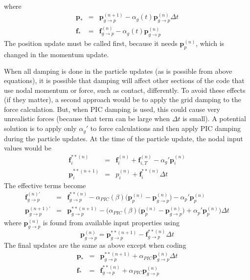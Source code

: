 \documentclass[11pt]{article}
\renewcommand{\vec}[1]{\boldsymbol{#1}}
\begin{document}
where
\begin{eqnarray}
   \vec{p}_*& = & \vec p_{g\to p}^{(n+1)} -  \alpha_g(t)\vec{p}_{g\to p}^{(n)}\Delta t   \\
   \vec{f}_* & = & \vec{f}_{g\to p}^{(n)} -  \alpha_g(t)\vec{p}_{g\to p}^{(n)} 
\end{eqnarray}
The position update must be called first, because it needs $\vec{p}_p^{(n)}$, which is changed in the momentum update.

When all damping is done in the particle updates (as is possible from above equations), it is possible that damping will affect other sections of the code that use nodal momentum or force, such as contact, differently. To avoid these effects (if they matter), a second approach would be to apply the grid damping to the force calculation. But, when PIC damping is used, this could cause very unrealistic forces (because that term can be large when $\Delta t$ is small). A potential solution is to apply only $\alpha_g'$ to force calculations and then apply PIC damping during the particle updates. At the time of the particle update, the nodal input values would be
\begin{eqnarray}
    \vec f_i^{**(n)} & = & \vec f_{i}^{(n)} + \vec f_{i,T}^{(n)} - \alpha_g'\vec p_i^{(n)} \\
    \vec p_i^{**(n+1)} & = &  p_i^{(n)} +  \vec f_i^{**(n)}\Delta t 
\end{eqnarray}
The effective terms become
\begin{eqnarray}
    \vec{f}_{g\to p}^{(n)'} & = &  \vec{f}_{g\to p}^{**(n)} - \alpha_{PIC}(\beta)\bigl(\vec p_p^{(n)}-\vec p_{g\to p}^{(n)}\bigr) -   \alpha_p'\vec{p}_p^{(n)} \\
    \vec p_{g\to p}^{(n+1)'} & = & \vec p_{g\to p}^{**(n+1)} - \biggl(\alpha_{PIC}(\beta)\bigl(\vec p_p^{(n)}-\vec p_{g\to p}^{(n)}\bigr)  + \alpha_p'\vec{p}_p^{(n)}\biggr)\Delta t 
\end{eqnarray}
where $\vec p_{g\to p}^{(n)}$ is found from available input properties using
\begin{equation}
 \vec p_{g\to p}^{(n)}  =  \vec p_{g\to p}^{**(n+1)}  - \vec{f}_{g\to p}^{**(n)}\Delta t
\end{equation}
The final updates are the same as above except when coding
\begin{eqnarray}
   \vec{p}_*& = & \vec p_{g\to p}^{**(n+1)} +  \alpha_{PIC}\vec{p}_{g\to p}^{(n)}\Delta t   \\
   \vec{f}_* & = & \vec{f}_{g\to p}^{**(n)} + \alpha_{PIC}\vec{p}_{g\to p}^{(n)} 
\end{eqnarray}
\end{document}
